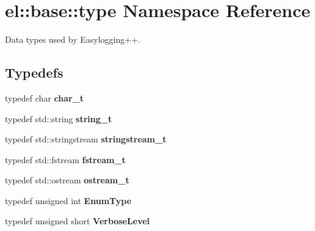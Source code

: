 \hypertarget{namespaceel_1_1base_1_1type}{\section{el\-:\-:base\-:\-:type Namespace Reference}
\label{namespaceel_1_1base_1_1type}
}


Data types used by Easylogging++.  


\subsection*{Typedefs}
\begin{DoxyCompactItemize}
\item 
\hypertarget{namespaceel_1_1base_1_1type_ae9fe1ba101c2444b8cad9a2484b54907}{typedef char {\bfseries char\-\_\-t}}\label{namespaceel_1_1base_1_1type_ae9fe1ba101c2444b8cad9a2484b54907}

\item 
\hypertarget{namespaceel_1_1base_1_1type_a67e406cd213c231f1d135b5a4eda64b5}{typedef std\-::string {\bfseries string\-\_\-t}}\label{namespaceel_1_1base_1_1type_a67e406cd213c231f1d135b5a4eda64b5}

\item 
\hypertarget{namespaceel_1_1base_1_1type_a3492908c4b80f97b6c4b346d394f1302}{typedef std\-::stringstream {\bfseries stringstream\-\_\-t}}\label{namespaceel_1_1base_1_1type_a3492908c4b80f97b6c4b346d394f1302}

\item 
\hypertarget{namespaceel_1_1base_1_1type_a620c830ead75d26b45c060c211ee2685}{typedef std\-::fstream {\bfseries fstream\-\_\-t}}\label{namespaceel_1_1base_1_1type_a620c830ead75d26b45c060c211ee2685}

\item 
\hypertarget{namespaceel_1_1base_1_1type_a74ea109bf34d1c44926837fb0830f445}{typedef std\-::ostream {\bfseries ostream\-\_\-t}}\label{namespaceel_1_1base_1_1type_a74ea109bf34d1c44926837fb0830f445}

\item 
\hypertarget{namespaceel_1_1base_1_1type_aa7dbdfaaff779b8e3d338e1b31707098}{typedef unsigned int {\bfseries Enum\-Type}}\label{namespaceel_1_1base_1_1type_aa7dbdfaaff779b8e3d338e1b31707098}

\item 
\hypertarget{namespaceel_1_1base_1_1type_a379652fdd9386faa5e26bf1f2493bffa}{typedef unsigned short {\bfseries Verbose\-Level}}\label{namespaceel_1_1base_1_1type_a379652fdd9386faa5e26bf1f2493bffa}


\end{DoxyCompactItemize}
